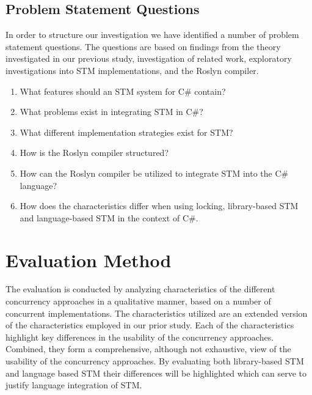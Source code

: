 \subsection{Problem Statement Questions}
In order to structure our investigation we have identified a number of problem statement questions. The questions are based on findings from the theory investigated in our previous study\cite{dpt907e14trending}, investigation of related work, exploratory investigations into \ac{STM} implementations, and the Roslyn compiler.

\begin{enumerate}
\item What features should an \ac{STM} system for C\# contain?
\item What problems exist in integrating \ac{STM} in C\#?
\item What different implementation strategies exist for \ac{STM}?
\item How is the Roslyn compiler structured?
\item How can the Roslyn compiler be utilized to integrate \ac{STM} into the C\# language?
\item How does the characteristics differ when using locking, library-based \ac{STM} and language-based \ac{STM} in the context of C\#.
\end{enumerate}

\section{Evaluation Method}\label{sec:eval_approach}
The evaluation is conducted by analyzing  characteristics of the different concurrency approaches in a qualitative manner, based on a number of concurrent implementations. The  characteristics utilized are an extended version of the characteristics employed in our prior study\cite[p. 15-21]{dpt907e14trending}.  Each of the characteristics highlight key differences in the usability of the concurrency approaches. Combined, they form a comprehensive, although not exhaustive, view of the usability of the concurrency approaches. By evaluating both library-based \ac{STM} and language based \ac{STM} their differences will be highlighted which can serve to justify language integration of \ac{STM}.

